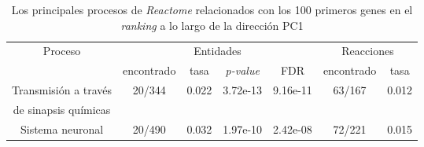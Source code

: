 

\begin{table}[!htb]
	\centering
	\caption{Los principales procesos de \textit{Reactome} relacionados con los 100 primeros genes en el \textit{ranking} a lo largo de la dirección PC1}
	\label{tab:apx4}
	\begin{tabular}{|c|c|c|c|c|c|c|}
		\hline
		\multirow{2}{*}{Proceso} & \multicolumn{4}{c|}{Entidades} & \multicolumn{2}{c|}{Reacciones} \\ \cline{2-7}
		 & encontrado & tasa & \textit{p-value} & FDR & encontrado & tasa \\ \hline
		 Transmisión a través  & \multirow{2}{*}{20/344} & \multirow{2}{*}{0.022} & \multirow{2}{*}{3.72e-13} & \multirow{2}{*}{9.16e-11} & \multirow{2}{*}{63/167} & \multirow{2}{*}{0.012} \\
		 de sinapsis químicas & & & & & & \\ \hline
		 
		 Sistema neuronal & 20/490 & 0.032 & 1.97e-10 & 2.42e-08 & 72/221 & 0.015 \\ \hline
		 
		 
	\end{tabular}
\end{table}